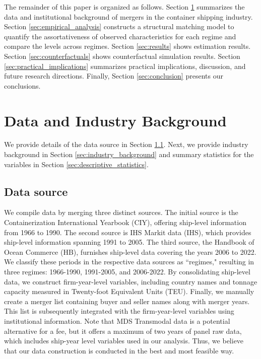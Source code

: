 \documentclass[10pt]{article}
\begin{document}
The remainder of this paper is organized as follows. 
Section \ref{sec:data_and_institutional_background} summarizes the data and institutional background of mergers in the container shipping industry.
Section \ref{sec:empirical_analysis} constructs a structural matching model to quantify the assortativeness of observed characteristics for each regime and compare the levels across regimes.
Section \ref{sec:results} shows estimation results.
Section \ref{sec:counterfactuals} shows counterfactual simulation results.
Section \ref{sec:practical_implications} summarizes practical implications, discussion, and future research directions.
Finally, Section \ref{sec:conclusion} presents our conclusions.


\section{Data and Industry Background}\label{sec:data_and_institutional_background}
We provide details of the data source in Section \ref{sec:data_source}. 
Next, we provide industry background in
Section \ref{sec:industry_background} and summary statistics for the variables in Section \ref{sec:descriptive_statistics}.




\subsection{Data source}\label{sec:data_source}
We compile data by merging three distinct sources.
The initial source is the Containerization International Yearbook (CIY), offering ship-level information from 1966 to 1990. 
The second source is IHS Markit data (IHS), which provides ship-level information spanning 1991 to 2005. 
The third source, the Handbook of Ocean Commerce (HB), furnishes ship-level data covering the years 2006 to 2022.
We classify these periods in the respective data sources as ``regimes," resulting in three regimes: 1966-1990, 1991-2005, and 2006-2022.
By consolidating ship-level data, we construct firm-year-level variables, including country names and tonnage capacity measured in Twenty-foot Equivalent Units (TEU).
Finally, we manually create a merger list containing buyer and seller names along with merger years. 
This list is subsequently integrated with the firm-year-level variables using institutional information. 
Note that MDS Transmodal data is a potential alternative for a fee, but it offers a maximum of two years of panel raw data, which includes ship-year level variables used in our analysis.
Thus, we believe that our data construction is conducted in the best and most feasible way.
\end{document}
